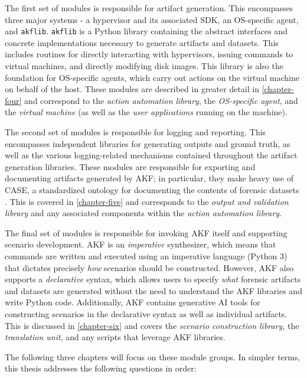 \documentclass[letterpaper,12pt]{report}
\newcommand{\passthrough}[1]{#1}
\begin{document}
The first set of modules is responsible for artifact generation. This
encompasses three major systems - a hypervisor and its associated SDK,
an OS-specific agent, and \passthrough{\lstinline!akflib!}.
\passthrough{\lstinline!akflib!} is a Python library containing the
abstract interfaces and concrete implementations necessary to generate
artifacts and datasets. This includes routines for directly interacting
with hypervisors, issuing commands to virtual machines, and directly
modifying disk images. This library is also the foundation for
OS-specific agents, which carry out actions on the virtual machine on
behalf of the host. These modules are described in greater detail in
\autoref{chapter-four} and correspond to the \emph{action
automation library}, the \emph{OS-specific agent}, and the \emph{virtual
machine} (as well as the \emph{user applications} running on the
machine).

The second set of modules is responsible for logging and reporting. This
encompasses independent libraries for generating outputs and ground
truth, as well as the various logging-related mechanisms contained
throughout the artifact generation libraries. These modules are
responsible for exporting and documenting artifacts generated by AKF; in
particular, they make heavy use of CASE, a standardized ontology for
documenting the contents of forensic datasets
\cite{caseyAdvancingCoordinatedCyberinvestigations2017}. This is
covered in \autoref{chapter-five} and corresponds to the
\emph{output and validation library} and any associated components
within the \emph{action automation library}.

The final set of modules is responsible for invoking AKF itself and
supporting scenario development. AKF is an \emph{imperative}
synthesizer, which means that commands are written and executed using an
imperative language (Python 3) that dictates precisely \emph{how}
scenarios should be constructed. However, AKF also supports a
\emph{declarative} syntax, which allows users to specify \emph{what}
forensic artifacts and datasets are generated without the need to
understand the AKF libraries and write Python code. Additionally, AKF
contains generative AI tools for constructing scenarios in the
declarative syntax as well as individual artifacts. This is discussed in
\autoref{chapter-six} and covers the \emph{scenario
construction library}, the \emph{translation unit}, and any scripts that
leverage AKF libraries.

The following three chapters will focus on these module groups. In
simpler terms, this thesis addresses the following questions in order:
\end{document}
